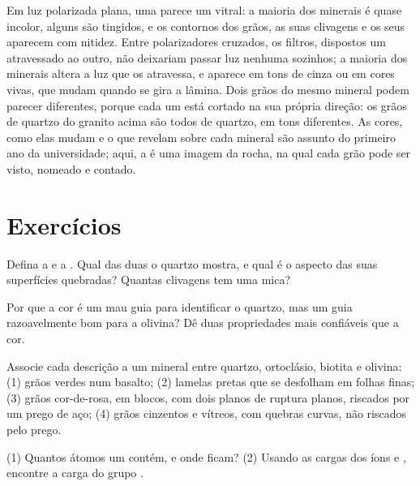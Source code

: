 Em luz polarizada plana, uma  parece um vitral: a maioria dos
minerais é quase incolor, alguns são tingidos, e os contornos dos grãos, as
suas clivagens e os seus  aparecem com nitidez. Entre polarizadores
cruzados, os filtros, dispostos um atravessado ao outro, não deixariam
passar luz nenhuma sozinhos; a maioria dos minerais altera a luz que os
atravessa, e aparece em tons de cinza ou em cores vivas, que mudam quando se
gira a lâmina. Dois grãos do mesmo mineral podem parecer diferentes, porque
cada um está cortado na sua própria direção: os grãos de quartzo do granito
acima são todos de quartzo, em tons diferentes. As cores, como elas mudam e
o que revelam sobre cada mineral são assunto do primeiro ano da
universidade; aqui, a  é uma imagem da rocha, na qual cada
grão pode ser visto, nomeado e contado.

\section{Exercícios}

\begin{exercise}[$\star$]\label{exo:g11:minerals:1}
Defina a  e a . Qual das duas o quartzo mostra, e qual é o
aspecto das suas superfícies quebradas? Quantas clivagens tem uma mica?
\end{exercise}

\begin{exercise}[$\star$]\label{exo:g11:minerals:2}
Por que a cor é um mau guia para identificar o quartzo, mas um guia
razoavelmente bom para a olivina? Dê duas propriedades mais confiáveis que a
cor.
\end{exercise}

\begin{exercise}[$\star$]\label{exo:g11:minerals:3}
Associe cada descrição a um mineral entre quartzo, ortoclásio, biotita e
olivina: (1) grãos verdes num basalto; (2) lamelas pretas que se desfolham em
folhas finas; (3) grãos cor-de-rosa, em blocos, com dois planos de ruptura
planos, riscados por um prego de aço; (4) grãos cinzentos e vítreos, com
quebras curvas, não riscados pelo prego.
\end{exercise}

\begin{exercise}[$\star$]\label{exo:g11:minerals:4}
(1) Quantos átomos um  contém, e onde ficam?
(2) Usando as cargas dos íons  e , encontre a carga do
grupo .
\end{exercise}

